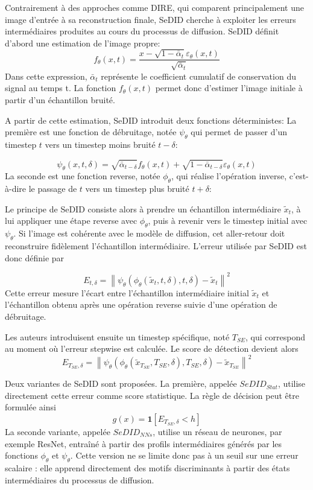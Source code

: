 \documentclass[runningheads]{llncs}
\begin{document}
Contrairement à des approches comme DIRE, qui comparent principalement une image d’entrée à sa reconstruction finale, SeDID\citep{ma2023exposingfakeeffectivediffusiongenerated} cherche à exploiter les erreurs intermédiaires produites au cours du processus de diffusion. SeDID définit d’abord une estimation de l’image propre:
$$
    f_\theta(x,t)=\frac{x-\sqrt{1-\bar{\alpha}_t}\varepsilon_\theta(x,t)}{\sqrt{\bar{\alpha}_t}}
$$
Dans cette expression, $\bar{\alpha}_t$ représente le coefficient cumulatif de conservation du signal au temps t. La fonction $f_\theta(x,t)$ permet donc d’estimer l’image initiale à partir d’un échantillon bruité.

A partir de cette estimation, SeDID introduit deux fonctions déterministes: La première est une fonction de débruitage, notée $\psi_\theta$ qui permet de passer d’un timestep $t$ vers un timestep moins bruité $t-\delta$:

$$
    \psi_\theta(x,t,\delta)=\sqrt{\bar{\alpha}_{t-\delta}}f_\theta(x,t)+\sqrt{1-\bar{\alpha}_{t-\delta}}\varepsilon_\theta(x,t)
$$
La seconde est une fonction reverse, notée $\phi_\theta$, qui réalise l’opération inverse, c’est-à-dire le passage de $t$ vers un timestep plus bruité $t+\delta$:


Le principe de SeDID consiste alors à prendre un échantillon intermédiaire 
$\tilde{x}_t$, à lui appliquer une étape reverse avec $\phi_\theta$, puis à revenir vers le timestep initial avec $\psi_\theta$. Si l’image est cohérente avec le modèle de diffusion, cet aller-retour doit reconstruire fidèlement l’échantillon intermédiaire. L’erreur utilisée par SeDID est donc définie par

$$
        E_{t,\delta}=\left\|\psi_\theta\left(\phi_\theta(\tilde{x}_t,t,\delta),t,\delta\right)-\tilde{x}_t\right\|^2
$$
Cette erreur mesure l’écart entre l’échantillon intermédiaire initial $\tilde{x}_t$ et l’échantillon obtenu après une opération reverse suivie d’une opération de débruitage.

Les auteurs introduisent ensuite un timestep spécifique, noté $T_{SE}$, qui correspond au moment où l’erreur stepwise est calculée. Le score de détection devient alors
$$
  E_{T_{SE},\delta}=\left\|\psi_\theta\left(\phi_\theta(\tilde{x}_{T_{SE}},T_{SE},\delta),T_{SE},\delta\right)-\tilde{x}_{T_{SE}}\right\|^2
$$

Deux variantes de SeDID sont proposées. La première, appelée $SeDID_{Stat}$, utilise directement cette erreur comme score statistique. La règle de décision peut être formulée ainsi
$$
    g(x)=\mathbf{1}\left[E_{T_{SE},\delta} < h\right]
$$
La seconde variante, appelée $SeDID_{NNs}$, utilise un réseau de neurones, par exemple ResNet, entraîné à partir des profils intermédiaires générés par les fonctions $\phi_\theta$ et $\psi_\theta$. Cette version ne se limite donc pas à un seuil sur une erreur scalaire : elle apprend directement des motifs discriminants à partir des états intermédiaires du processus de diffusion.
\end{document}
